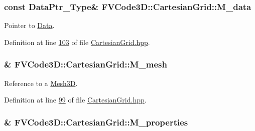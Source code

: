 \subsubsection[{\texorpdfstring{M\+\_\+data}{M_data}}]{\setlength{\rightskip}{0pt plus 5cm}const {\bf Data\+Ptr\+\_\+\+Type}\& F\+V\+Code3\+D\+::\+Cartesian\+Grid\+::\+M\+\_\+data\hspace{0.3cm}{\ttfamily [protected]}}\hypertarget{classFVCode3D_1_1CartesianGrid_a8548798ae1d2a011869ed314a1ebb8f3}{}\label{classFVCode3D_1_1CartesianGrid_a8548798ae1d2a011869ed314a1ebb8f3}


Pointer to \hyperlink{classFVCode3D_1_1Data}{Data}. 



Definition at line \hyperlink{CartesianGrid_8hpp_source_l00103}{103} of file \hyperlink{CartesianGrid_8hpp_source}{Cartesian\+Grid.\+hpp}.

\subsubsection[{\texorpdfstring{M\+\_\+mesh}{M_mesh}}]{\& F\+V\+Code3\+D\+::\+Cartesian\+Grid\+::\+M\+\_\+mesh\hspace{0.3cm}{\ttfamily [protected]}}\hypertarget{classFVCode3D_1_1CartesianGrid_a40c64e663b3d2de02b852403c75495fb}{}\label{classFVCode3D_1_1CartesianGrid_a40c64e663b3d2de02b852403c75495fb}


Reference to a \hyperlink{classFVCode3D_1_1Mesh3D}{Mesh3D}. 



Definition at line \hyperlink{CartesianGrid_8hpp_source_l00099}{99} of file \hyperlink{CartesianGrid_8hpp_source}{Cartesian\+Grid.\+hpp}.

\subsubsection[{\texorpdfstring{M\+\_\+properties}{M_properties}}]{\& F\+V\+Code3\+D\+::\+Cartesian\+Grid\+::\+M\+\_\+properties\hspace{0.3cm}{\ttfamily [protected]}}\hypertarget{classFVCode3D_1_1CartesianGrid_a5d2cd7d64a7feeb775251173f14892af}{}\label{classFVCode3D_1_1CartesianGrid_a5d2cd7d64a7feeb775251173f14892af}


